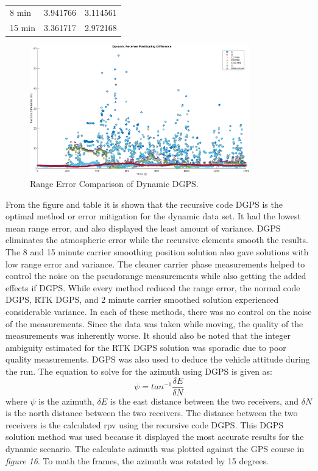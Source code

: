 \documentclass[11pt]{article}
\begin{document}
\begin{enumerate}[label=\textbf{\arabic*.}]
\begin{table}[H]
\begin{tabular}{ P{5cm}|P{3cm} P{3cm} }
             8 min & 3.941766 & 3.114561 \\
             15 min & 3.361717 & 2.972168
          \end{tabular}
    \end{table}
        \begin{figure}[H]
            \centering
            \includegraphics[width=0.85\textwidth]{p3_comp.png}
            \caption{Range Error Comparison of Dynamic DGPS.}
        \end{figure}
From the figure and table it is shown that the recursive code DGPS is the optimal method or error mitigation for the dynamic data set. It had the lowest mean range error, and also displayed the least amount of variance. DGPS eliminates the atmospheric error while the recursive elements smooth the results. The 8 and 15 minute carrier smoothing position solution also gave solutions with low range error and variance. The cleaner carrier phase measurements helped to control the noise on the pseudorange measurements while also getting the added effects if DGPS. While every method reduced the range error, the normal code DGPS, RTK DGPS, and 2 minute carrier smoothed solution experienced considerable variance. In each of these methods, there was no control on the noise of the measurements. Since the data was taken while moving, the quality of the measurements was inherently worse. It should also be noted that the integer ambiguity estimated for the RTK DGPS solution was sporadic due to poor quality measurements. DGPS was also used to deduce the vehicle attitude during the run. The equation to solve for the azimuth using DGPS is given as:
    \begin{equation}
        \psi=tan^{-1}{\dfrac{\delta E}{\delta N}}
    \end{equation}
where $\psi$ is the azimuth, $\delta E$ is the east distance between the two receivers, and $\delta N$ is the north distance between the two receivers. The distance between the two receivers is the calculated rpv using the recursive code DGPS. This DGPS solution method was used because it displayed the most accurate results for the dynamic scenario. The calculate azimuth was plotted against the GPS course in \emph{figure 16}. To math the frames, the azimuth was rotated by 15 degrees.

\end{enumerate}
\end{document}
